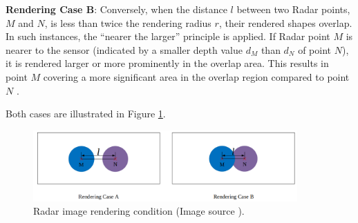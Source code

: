 \documentclass[report.tex]{subfiles}
\begin{document}
    \textbf{Rendering Case B}: Conversely, when the distance \( l \) between two Radar points, \( M \) and \( N \), is less than twice the rendering radius \( r \), their rendered shapes overlap. In such instances, the ``nearer the larger'' principle is applied. If Radar point \( M \) is nearer to the sensor (indicated by a smaller depth value \( d_M \) than \( d_N \) of point \( N \)), it is rendered larger or more prominently in the overlap area. This results in point \( M \) covering a more significant area in the overlap region compared to point \( N \) \cite{chang2020spatial}.

    Both cases are illustrated in Figure \ref{fig:saffcos_Radar_image_rendering_condition}.

    \begin{figure}[h]
        \centering
        \includegraphics[width=0.9\textwidth]{images/methods/saf_fcos/Radar image rendering condition.png}
        \caption{Radar image rendering condition (Image source \cite{chang2020spatial}).}
        \label{fig:saffcos_Radar_image_rendering_condition}
    \end{figure}


            
\end{document}
